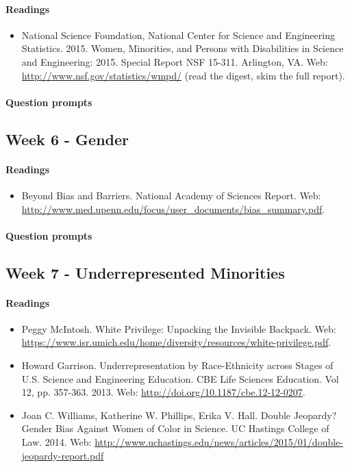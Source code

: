 \documentclass{article}
\begin{document}
\paragraph{Readings}
\begin{itemize}
\item National Science Foundation, National Center for Science and Engineering Statistics. 2015. Women, Minorities, and Persons with Disabilities in Science and Engineering: 2015. Special Report NSF 15-311. Arlington, VA. Web: \url{http://www.nsf.gov/statistics/wmpd/} (read the digest, skim the full report).
\end{itemize}
\paragraph{Question prompts}


\subsection{Week 6 - Gender}
\paragraph{Readings}
\begin{itemize}
\item Beyond Bias and Barriers. National Academy of Sciences Report. Web: \url{http://www.med.upenn.edu/focus/user_documents/bias_summary.pdf}.
\end{itemize}
\paragraph{Question prompts}


\subsection{Week 7 - Underrepresented Minorities}
\paragraph{Readings}
\begin{itemize}
\item Peggy McIntosh. White Privilege: Unpacking the Invisible Backpack. Web: \url{https://www.isr.umich.edu/home/diversity/resources/white-privilege.pdf}.
\item Howard Garrison. Underrepresentation by Race-Ethnicity across Stages of U.S. Science and Engineering Education. CBE Life Sciences Education. Vol 12, pp. 357-363. 2013. Web: \url{http://doi.org/10.1187/cbe.12-12-0207}.
\item Joan C. Williams, Katherine W. Phillips, Erika V. Hall. Double Jeopardy? Gender Bias Against Women of Color in Science. UC Hastings College of Law. 2014. Web: \url{http://www.uchastings.edu/news/articles/2015/01/double-jeopardy-report.pdf}
\end{itemize}
\end{document}
